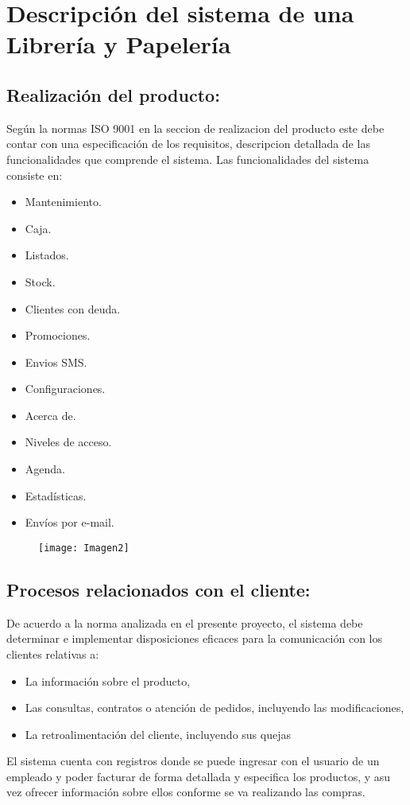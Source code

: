\documentclass[11 pt]{article}
\begin{document}
\section{Descripción del sistema de una Librería y Papelería}
\subsection{Realización del producto:}
Según la normas ISO 9001 en la seccion de realizacion del producto este debe contar con una especificación de los requisitos, descripcion detallada de las funcionalidades que comprende el sistema. Las funcionalidades del sistema consiste en: 

\begin{itemize}
	\item Mantenimiento.
	\item Caja.
	\item Listados.
	\item Stock.
	\item Clientes con deuda.
	\item Promociones.
	\item Envios SMS.
	\item Configuraciones.
	\item Acerca de.
	\item Niveles de acceso.
	\item Agenda.
	\item Estadísticas.
	\item Envíos por e-mail.	
\end{itemize}

\begin{figure}[h]
	\centering
	\texttt{[image: Imagen2]}
\end{figure}

\subsection{Procesos relacionados con el cliente:}
De acuerdo a la norma analizada en el presente proyecto, el sistema debe determinar e implementar disposiciones eficaces para la comunicación con los clientes relativas a:
\begin{itemize}
	\item La información sobre el producto,
	\item Las consultas, contratos o atención de pedidos, incluyendo las modificaciones,
	\item La retroalimentación del cliente, incluyendo sus quejas	
\end{itemize}
El sistema cuenta con registros donde se puede ingresar con el usuario de un empleado y poder facturar de forma detallada y especifica los productos, y asu vez ofrecer información sobre ellos conforme se va realizando las compras.
\end{document}
